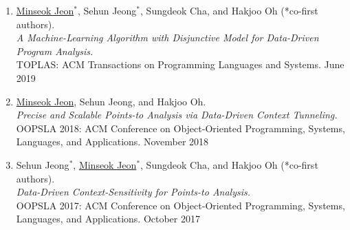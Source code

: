 \documentclass[letterpaper,11pt]{article}
\begin{document}
\begin{enumerate}
{    OOPSLA 2020: ACM Conference on Object-Oriented Programming, Systems, Languages, and Applications. November 2020
  }
  \item{\underline{Minseok Jeon}$^*$, Sehun Jeong$^*$, Sungdeok Cha, and Hakjoo Oh (*co-first authors).\\
  \textit{A Machine-Learning Algorithm with Disjunctive Model for Data-Driven Program Analysis.}\\
  TOPLAS: ACM Transactions on Programming Languages and Systems. June 2019
  }
  \item{\underline{Minseok Jeon}, Sehun Jeong, and Hakjoo Oh.\\
  \textit{Precise and Scalable Points-to Analysis via Data-Driven Context Tunneling.}\\
  OOPSLA 2018: ACM Conference on Object-Oriented Programming, Systems, Languages, and Applications. November 2018
  }
  \item {Sehun Jeong$^*$, \underline{Minseok Jeon}$^*$, Sungdeok Cha, and Hakjoo Oh  (*co-first
  authors).\\\textit{Data-Driven Context-Sensitivity for Points-to Analysis.}\\
  OOPSLA 2017: ACM Conference on Object-Oriented Programming, Systems, Languages, and Applications. October 2017
  }
\end{enumerate}


  
\end{document}
